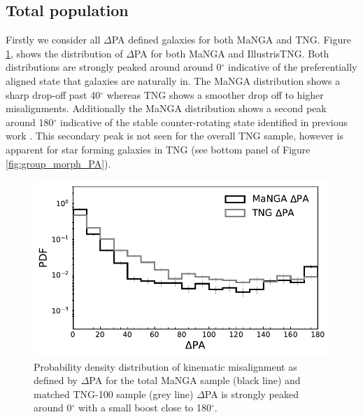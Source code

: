 \documentclass[fleqn,usenatbib]{mnras}
\begin{document}
\subsection{Total population} \label{sec:manga_total_pop}
Firstly we consider all $\Delta$PA defined galaxies for both MaNGA and TNG. Figure \ref{fig:total_pa_dist}, shows the distribution of $\Delta$PA for both MaNGA and IllustrisTNG. Both distributions are strongly peaked around around 0$^{\circ}$ indicative of the preferentially aligned state that galaxies are naturally in. The MaNGA distribution shows a sharp drop-off past 40$^{\circ}$ whereas TNG shows a smoother drop off to higher misalignments. Additionally the MaNGA distribution shows a second peak around 180$^{\circ}$ indicative of the stable counter-rotating state identified in previous work \citep[e.g.][]{chen2016}. This secondary peak is not seen for the overall TNG sample, however is apparent for star forming galaxies in TNG (see bottom panel of Figure \ref{fig:group_morph_PA}). 

\begin{figure}
	\includegraphics[width=\linewidth]{total_pop/mpl8_pa_dist.pdf}
    \caption{Probability density distribution of kinematic misalignment as defined by $\Delta$PA for the total MaNGA sample (black line) and matched TNG-100 sample (grey line)  $\Delta$PA is strongly peaked around 0$^{\circ}$ with a small boost close to 180$^{\circ}$.}
    \label{fig:total_pa_dist}
\end{figure}
\end{document}
